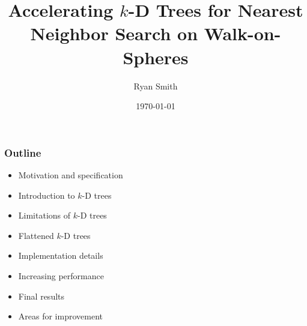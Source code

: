 \documentclass[lualatex,aspectratio=169]{beamer}
\title{Accelerating $k$-D Trees for Nearest Neighbor Search on Walk-on-Spheres}
\date[\today]{\today}
\author[Ryan Smith]{Ryan Smith}
\newcommand{\kd}{$k$-D\xspace}
\begin{document}
\begin{frame}
  \titlepage
\end{frame}

\begin{frame} 

  \frametitle{Outline} 

  \begin{itemize} 
    \item Motivation and specification
    \item Introduction to \kd trees
    \item Limitations of \kd trees
    \item Flattened \kd trees
    \item Implementation details
    \item Increasing performance
    \item Final results
    \item Areas for improvement
  \end{itemize}

\end{frame}






\end{document}
